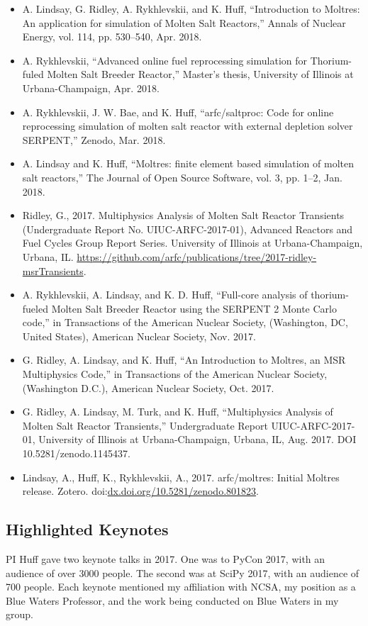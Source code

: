 \documentclass[letterpaper]{article}
\begin{document}
\begin{itemize}
        \item A. Lindsay, G. Ridley, A. Rykhlevskii, and K. Huff, ``Introduction to Moltres: An application for simulation of Molten Salt Reactors,'' Annals of Nuclear Energy, vol. 114, pp. 530–540, Apr. 2018.
        \item A. Rykhlevskii, ``Advanced online fuel reprocessing simulation for Thorium-fuled Molten Salt Breeder Reactor,'' Master’s thesis, University of Illinois at Urbana-Champaign, Apr. 2018.
        \item A. Rykhlevskii, J. W. Bae, and K. Huff, ``arfc/saltproc: Code for online reprocessing simulation of molten salt reactor with external depletion solver SERPENT,'' Zenodo, Mar. 2018.
        \item A. Lindsay and K. Huff, ``Moltres: finite element based simulation of molten salt reactors,'' The Journal of Open Source Software, vol. 3, pp. 1–2, Jan. 2018.
        \item Ridley, G., 2017. Multiphysics Analysis of Molten Salt Reactor Transients (Undergraduate Report No. UIUC-ARFC-2017-01), Advanced Reactors and Fuel Cycles Group Report Series. University of Illinois at Urbana-Champaign, Urbana, IL. \url{https://github.com/arfc/publications/tree/2017-ridley-msrTransients}.
        \item A. Rykhlevskii, A. Lindsay, and K. D. Huff, ``Full-core analysis of thorium-fueled Molten Salt Breeder Reactor using the SERPENT 2 Monte Carlo code,'' in Transactions of the American Nuclear Society, (Washington, DC, United States), American Nuclear Society, Nov. 2017.
        \item G. Ridley, A. Lindsay, and K. Huff, ``An Introduction to Moltres, an MSR Multiphysics Code,'' in Transactions of the American Nuclear Society, (Washington D.C.), American Nuclear Society, Oct. 2017.
        \item G. Ridley, A. Lindsay, M. Turk, and K. Huff, ``Multiphysics Analysis of Molten Salt Reactor Transients,'' Undergraduate Report UIUC-ARFC-2017-01, University of Illinois at Urbana-Champaign, Urbana, IL, Aug. 2017. DOI 10.5281/zenodo.1145437.
	\item Lindsay, A., Huff, K., Rykhlevskii, A., 2017. arfc/moltres: Initial Moltres release. Zotero. doi:\url{dx.doi.org/10.5281/zenodo.801823}.
\end{itemize}

\subsection{Highlighted Keynotes}
PI Huff gave two keynote talks in 2017. One was to PyCon 2017, with an audience of over 3000 people. The 
second was at SciPy 2017, with an audience of 700 people. Each keynote 
mentioned my affiliation with NCSA, my position as a Blue Waters Professor, and 
the work being conducted on Blue Waters in my group. 
\end{document}
